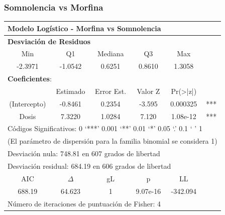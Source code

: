 \documentclass[10pt]{beamer}
\begin{document}
	
	\begin{frame}
		\frametitle{Somnolencia vs Morfina}
		
	\begin{table}[]
	\centering
	\small
	\begin{tabular}{|c|c|c|c|c|c|}
		\hline
		\multicolumn{6}{|l|}{\textbf{Modelo Logístico - Morfina vs Somnolencia}}                       \\ \hline
		\multicolumn{6}{|l|}{\textbf{{Desviación de Residuos}}}                                        \\ \hline
		    Min      &    Q1    &  Mediana   &    Q3    &          Max          &                      \\ \hline
		  -2.3971    & -1.0542  &   0.6251   &  0.8610  &        1.3058         &                      \\ \hline
		\multicolumn{6}{|l|}{\textbf{Coeficientes}:}                                                   \\ \hline
		             & Estimado & Error Est. & Valor Z  & Pr(\textgreater{}|z|) &                      \\ \hline
		(Intercepto) & -0.8461  &   0.2354   &  -3.595  &       0.000325        &         ***          \\ \hline
		   Dosis     &  7.3220  &   1.0284   &  7.120   &       1.08e-12        &         ***          \\ \hline
		\multicolumn{6}{|l|}{Códigos Significativos:  0 ‘***’ 0.001 ‘**’ 0.01 ‘*’  0.05 ‘.’ 0.1 ‘ ’ 1} \\ \hline
		\multicolumn{6}{|l|}{(El parámetro de dispersión para la familia binomial se considera 1)}     \\ \hline
		\multicolumn{6}{|l|}{Desviación nula: 748.81 en 607 grados de libertad}                        \\ \hline
		\multicolumn{6}{|l|}{Desviación residual: 684.19 en 606 grados de libertad}                    \\ \hline
		    AIC      & $\Delta$ &     gL     &    p     &          LL           &                      \\ \hline
		   688.19    &  64.623  &     1      & 9.07e-16 &       -342.094        &                      \\ \hline
		\multicolumn{6}{|l|}{Número de iteraciones de puntuación de Fisher: 4}                         \\ \hline
	\end{tabular}
\end{table}
	\end{frame}
	
\end{document}
